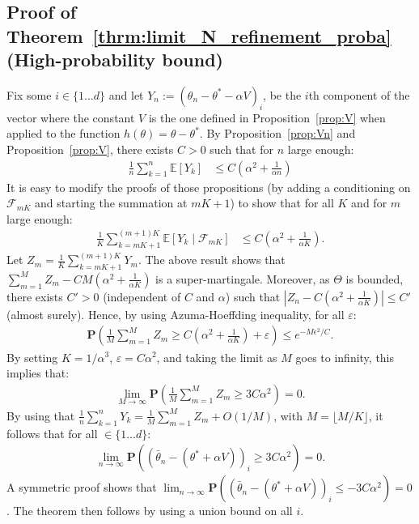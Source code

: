 \documentclass{article}
\newcommand{\calF}{\mathcal{F}}
\newcommand\Proba[1]{\mathbf{P}\left(#1\right)}
\newcommand\E{\mathbb{E}}
\newcommand\esp[1]{\E\left[#1\right]}
\begin{document}
\subsection{Proof of Theorem~\ref{thrm:limit_N_refinement_proba} (High-probability bound)}
\label{ssec:high-proba}

Fix some $i\in\{1\dots d\}$ and let $Y_n := (\theta_n-\theta^*-\alpha V)_i$, be the $i$th component of the vector where the constant $V$ is the one defined in Proposition~\ref{prop:V} when applied to the function $h(\theta)=\theta-\theta^*$.  By Proposition~\ref{prop:Vn} and Proposition~\ref{prop:V}, there exists $C>0$ such that for $n$ large enough:
\begin{align*}
    \frac1n \sum_{k=1}^n \esp{Y_{k}}  &\le C (\alpha^2 + \frac{1}{\alpha n} )
\end{align*}
It is easy to modify the proofs of those propositions (by adding a conditioning on $\calF_{mK}$ and starting the summation at $mK+1$) to show that for all $K$ and for $m$ large enough:
\begin{align*}
    \frac1{K} \sum_{k=mK+1}^{(m+1)K} \esp{Y_{k}\mid \calF_{mK}}  &\le C (\alpha^2 + \frac{1}{\alpha K} ).
\end{align*}
Let $Z_m= \frac1{K} \sum_{k=mK+1}^{(m+1)K} Y_m $. The above result shows that $\sum_{m=1}^M Z_m - C M(\alpha^2 + \frac{1}{\alpha K} )$ is a super-martingale. Moreover, as $\Theta$ is bounded, there exists $C'>0$ (independent of $C$ and $\alpha$) such that $|Z_n- C (\alpha^2 + \frac{1}{\alpha K} )|\le C'$ (almost surely). Hence, by using Azuma-Hoeffding inequality, for all $\varepsilon$:
\begin{align*}
    \Proba{ \frac1M \sum_{m=1}^M Z_m \ge C (\alpha^2 + \frac{1}{\alpha K} ) + \varepsilon} \le e^{- M \epsilon^2 / C }.
\end{align*}
By setting $K=1/\alpha^3$, $\varepsilon=C \alpha^2$, and taking the limit as $M$ goes to infinity, this implies that: 
\begin{align*}
    \lim_{M\to\infty }\Proba{ \frac1M \sum_{m=1}^M Z_m \ge 3 C \alpha^2 } = 0.
\end{align*}
By using that $\frac1n \sum_{k=1}^n Y_k= \frac1M \sum_{m=1}^M Z_m + O(1/M)$, with $M=\lfloor M/K\rfloor$, it follows that for all $\in\{1\dots d\}$:
\begin{align*}
    \lim_{n\to\infty}\Proba{ (\bar{\theta}_n-(\theta^*+\alpha V))_i \ge 3C\alpha^2} = 0.
\end{align*}
A symmetric proof shows that $\lim_{n\to\infty}\Proba{ (\bar{\theta}_n-(\theta^*+\alpha V))_i \le -3C\alpha^2} = 0$. The theorem then follows by using a union bound on all $i$. 
\end{document}
